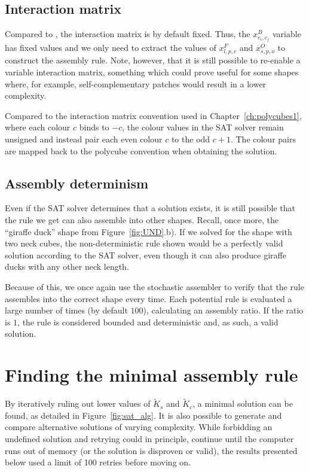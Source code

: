 \subsection{Interaction matrix}
Compared to \cite{romano2020designing}, the interaction matrix is by default fixed. Thus, the \(x_{c_i,c_j}^{B}\) variable has fixed values and we only need to extract the values of \(x_{l,p,c}^{F}\) and \(x_{s,p,o}^{O}\) to construct the assembly rule. Note, however, that it is still possible to re-enable a variable interaction matrix, something which could prove useful for some shapes where, for example, self-complementary patches would result in a lower complexity.

Compared to the interaction matrix convention used in Chapter~\ref{ch:polycubes1}, where each colour \(c\) binds to \(-c\), the colour values in the SAT solver remain unsigned and instead pair each even colour \(c\) to the odd \(c+1\). The colour pairs are mapped back to the polycube convention when obtaining the solution.

\subsection{Assembly determinism}
Even if the SAT solver determines that a solution exists, it is still possible that the rule we get can also assemble into other shapes. Recall, once more, the ``giraffe duck'' shape from Figure~\ref{fig:UND}.b). If we solved for the shape with two neck cubes, the non-deterministic rule shown would be a perfectly valid solution according to the SAT solver, even though it can also produce giraffe ducks with any other neck length.

Because of this, we once again use the stochastic assembler to verify that the rule assembles into the correct shape every time. Each potential rule is evaluated a large number of times (by default \(100\)), calculating an assembly ratio. If the ratio is \(1\), the rule is considered bounded and deterministic and, as such, a valid solution.


\section{Finding the minimal assembly rule}

By iteratively ruling out lower values of \(\widetilde{K}_s\) and \(\widetilde{K}_c\), a minimal solution can be found, as detailed in Figure~\ref{fig:sat_alg}. It is also possible to generate and compare alternative solutions of varying complexity. While forbidding an undefined solution and retrying could in principle, continue until the computer runs out of memory (or the solution is disproven or valid), the results presented below used a limit of 100 retries before moving on.

